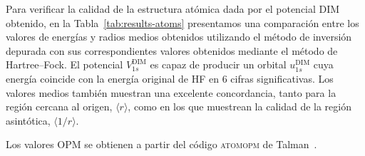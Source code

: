 Para verificar la calidad de la estructura atómica dada por el potencial 
DIM obtenido, en la Tabla~\ref{tab:results-atoms} presentamos una 
comparación entre los valores de energías y radios medios obtenidos 
utilizando el método de inversión depurada con sus correspondientes 
valores obtenidos mediante el método de Hartree--Fock. El potencial 
$V_{1s}^{\mathrm{ DIM}}$ es capaz de producir un orbital 
$u_{1s}^{\mathrm{ DIM}}$ cuya energía coincide con la energía original 
de HF en 6 cifras significativas. Los valores medios también muestran 
una excelente concordancia, tanto para la región cercana al origen, 
$\langle r \rangle$, como en los que muestrean la calidad de la región 
asintótica, $\langle 1/r\rangle$.


Los valores OPM se obtienen a partir del código \textsc{atomopm} de 
Talman~\cite{Talman:89}.

